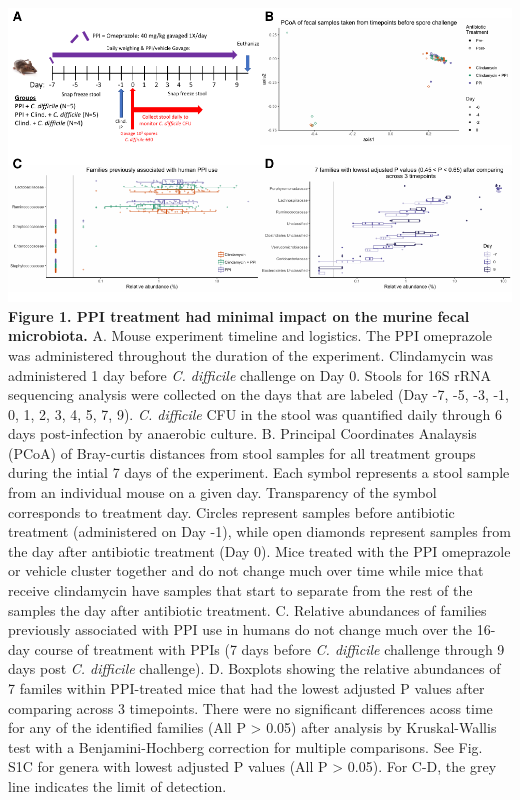\documentclass[11pt,]{article}
\begin{document}
\includegraphics{figure_1.pdf} \textbf{Figure 1. PPI treatment had
minimal impact on the murine fecal microbiota.} A. Mouse experiment
timeline and logistics. The PPI omeprazole was administered throughout
the duration of the experiment. Clindamycin was administered 1 day
before \emph{C. difficile} challenge on Day 0. Stools for 16S rRNA
sequencing analysis were collected on the days that are labeled (Day -7,
-5, -3, -1, 0, 1, 2, 3, 4, 5, 7, 9). \emph{C. difficile} CFU in the
stool was quantified daily through 6 days post-infection by anaerobic
culture. B. Principal Coordinates Analaysis (PCoA) of Bray-curtis
distances from stool samples for all treatment groups during the intial
7 days of the experiment. Each symbol represents a stool sample from an
individual mouse on a given day. Transparency of the symbol corresponds
to treatment day. Circles represent samples before antibiotic treatment
(administered on Day -1), while open diamonds represent samples from the
day after antibiotic treatment (Day 0). Mice treated with the PPI
omeprazole or vehicle cluster together and do not change much over time
while mice that receive clindamycin have samples that start to separate
from the rest of the samples the day after antibiotic treatment. C.
Relative abundances of families previously associated with PPI use in
humans do not change much over the 16-day course of treatment with PPIs
(7 days before \emph{C. difficile} challenge through 9 days post
\emph{C. difficile} challenge). D. Boxplots showing the relative
abundances of 7 familes within PPI-treated mice that had the lowest
adjusted P values after comparing across 3 timepoints. There were no
significant differences acoss time for any of the identified families
(All P \textgreater{} 0.05) after analysis by Kruskal-Wallis test with a
Benjamini-Hochberg correction for multiple comparisons. See Fig. S1C for
genera with lowest adjusted P values (All P \textgreater{} 0.05). For
C-D, the grey line indicates the limit of detection.
\end{document}
